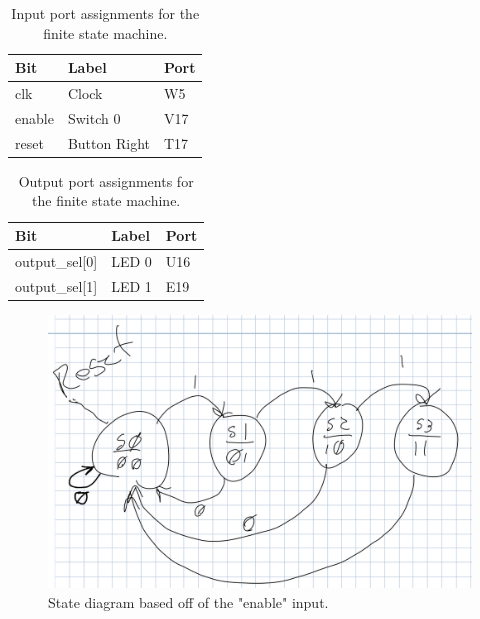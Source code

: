 \documentclass[11pt]{article}
\begin{document}
\begin{table}[H]
\begin{center}
\begin{tabular}{| l | l | l |}
	\hline
	Bit & Label & Port \\ \hline
	clk &  Clock & W5 \\ \hline
	enable & Switch 0 & V17 \\ \hline
	reset & Button Right & T17 \\ \hline
\end{tabular}
\caption{\label{tab:fsm_input_Ports}Input port assignments for  the finite state machine.}
\end{center}
\end{table}

\begin{table}[H]
\begin{center}
\begin{tabular}{| l | l | l |}
	\hline
	Bit & Label & Port \\ \hline
	output\_sel[0] & LED 0 & U16 \\ \hline
	output\_sel[1] & LED 1 & E19 \\ \hline
\end{tabular}
\caption{\label{tab:fsm_output_Ports}Output port assignments for the finite state machine.}
\end{center}
\end{table}

\begin{center}
\begin{figure}[H]
	\includegraphics[width=\textwidth]{./images/fsmStateDiagram.png}
	\caption{\label{fig:fsm_state_diagram}State diagram based off of the "enable" input.}
\end{figure}
\end{center}
\end{document}

